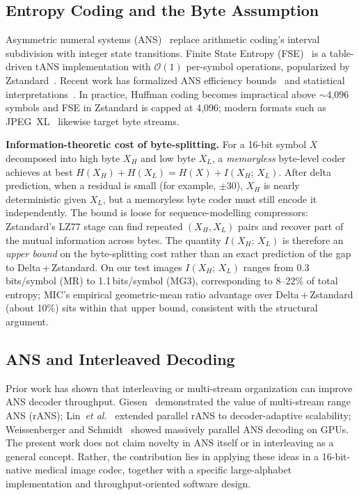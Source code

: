 \documentclass[journal]{IEEEtran}
\begin{document}
\subsection{Entropy Coding and the Byte Assumption}

Asymmetric numeral systems (ANS)~\cite{duda2009,duda2013} replace arithmetic
coding's interval subdivision with integer state transitions. Finite State
Entropy (FSE)~\cite{fse} is a table-driven tANS implementation with
$\mathcal{O}(1)$ per-symbol operations, popularized by Zstandard~\cite{rfc8878}.
Recent work has formalized ANS efficiency bounds~\cite{kosolobov2022} and
statistical interpretations~\cite{bamler2022}. In practice, Huffman coding
becomes impractical above ${\sim}$4,096 symbols and FSE in Zstandard is capped
at 4,096; modern formats such as JPEG~XL~\cite{jpegxl} likewise target byte
streams.

\textbf{Information-theoretic cost of byte-splitting.} For a 16-bit symbol $X$
decomposed into high byte $X_H$ and low byte $X_L$, a \emph{memoryless}
byte-level coder achieves at best $H(X_H)+H(X_L)=H(X)+I(X_H;\,X_L)$. After
delta prediction, when a residual is small (for example, $\pm 30$), $X_H$ is
nearly deterministic given $X_L$, but a memoryless byte coder must still
encode it independently. The bound is loose for sequence-modelling
compressors: Zstandard's LZ77 stage can find repeated $(X_H,X_L)$ pairs and
recover part of the mutual information across bytes. The quantity
$I(X_H;\,X_L)$ is therefore an \emph{upper bound} on the byte-splitting cost
rather than an exact prediction of the gap to Delta\,+\,Zstandard. On our
test images $I(X_H;\,X_L)$ ranges from 0.3\,bits/symbol (MR) to
1.1\,bits/symbol (MG3), corresponding to 8--22\% of total entropy; MIC's
empirical geometric-mean ratio advantage over Delta\,+\,Zstandard (about
10\%) sits within that upper bound, consistent with the structural argument.

\subsection{ANS and Interleaved Decoding}

Prior work has shown that interleaving or multi-stream organization can improve
ANS decoder throughput. Giesen~\cite{giesen2014,giesen2014b} demonstrated the
value of multi-stream range ANS (rANS); Lin~\textit{et al.}~\cite{lin2023}
extended parallel rANS to decoder-adaptive scalability;
Weissenberger and Schmidt~\cite{weissenberger2019} showed massively parallel
ANS decoding on GPUs. The present work does not claim novelty in ANS itself or
in interleaving as a general concept. Rather, the contribution lies in applying
these ideas in a 16-bit-native medical image codec, together with a specific
large-alphabet implementation and throughput-oriented software design.
\end{document}
